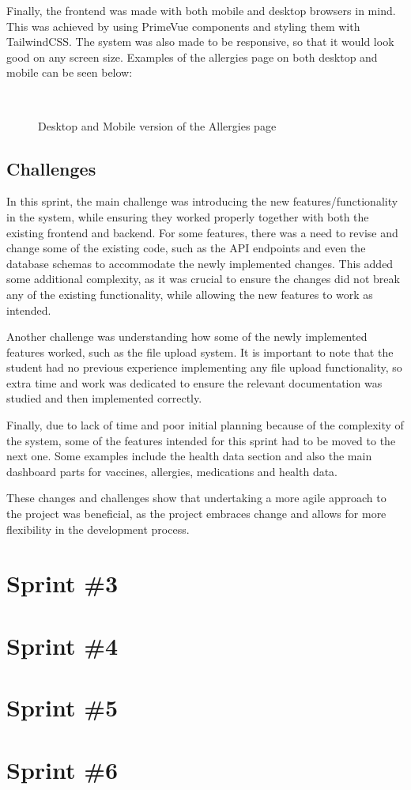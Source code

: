 Finally, the frontend was made with both mobile and desktop browsers in mind. This was achieved by using PrimeVue components and styling them with TailwindCSS. The system was also made to be responsive, so that it would look good on any screen size. Examples of the allergies page on both desktop and mobile can be seen below:

\begin{figure}[ht]
  \centering
  \\[\baselineskip]
  \caption{Desktop and Mobile version of the Allergies page}
  \label{fig:allergiespage}
\end{figure}

\FloatBarrier

\subsection{Challenges}

In this sprint, the main challenge was introducing the new features/functionality in the system, while ensuring they worked properly together with both the existing frontend and backend. For some features, there was a need to revise and change some of the existing code, such as the API endpoints and even the database schemas to accommodate the newly implemented changes. This added some additional complexity, as it was crucial to ensure the changes did not break any of the existing functionality, while allowing the new features to work as intended.

Another challenge was understanding how some of the newly implemented features worked, such as the file upload system. It is important to note that the student had no previous experience implementing any file upload functionality, so extra time and work was dedicated to ensure the relevant documentation was studied and then implemented correctly.

Finally, due to lack of time and poor initial planning because of the complexity of the system, some of the features intended for this sprint had to be moved to the next one. Some examples include the health data section and also the main dashboard parts for vaccines, allergies, medications and health data. 

These changes and challenges show that undertaking a more agile approach to the project was beneficial, as the project embraces change and allows for more flexibility in the development process.

\section{Sprint \#3}

\section{Sprint \#4}

\section{Sprint \#5}

\section{Sprint \#6}